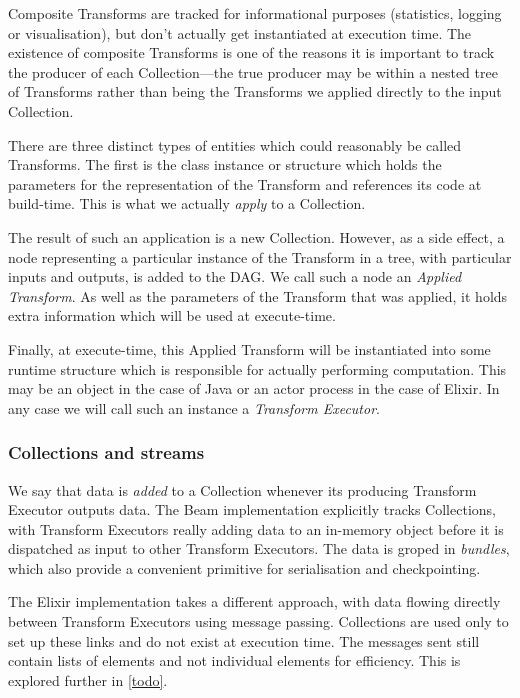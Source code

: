Composite Transforms are tracked for informational purposes (statistics, logging or visualisation), but don't actually get instantiated at execution time.
The existence of composite Transforms is one of the reasons it is important to track the producer of each Collection---the true producer may be within a nested tree of Transforms rather than being the Transforms we applied directly to the input Collection.



There are three distinct types of entities which could reasonably be called Transforms.
The first is the class instance or structure which holds the parameters for the representation of the Transform and references its code at build-time.
This is what we actually \emph{apply} to a Collection.

The result of such an application is a new Collection.
However, as a side effect, a node representing a particular instance of the Transform in a tree, with particular inputs and outputs, is added to the DAG.
We call such a node an \emph{Applied Transform}.
As well as the parameters of the Transform that was applied, it holds extra information which will be used at execute-time.

Finally, at execute-time, this Applied Transform will be instantiated into some runtime structure which is responsible for actually performing computation.
This may be an object in the case of Java or an actor process in the case of Elixir.
In any case we will call such an instance a \emph{Transform Executor}.

\subsubsection{Collections and streams}

We say that data is \emph{added} to a Collection whenever its producing Transform Executor outputs data.
The Beam implementation explicitly tracks Collections, with Transform Executors really adding data to an in-memory object before it is dispatched as input to other Transform Executors.
The data is groped in \emph{bundles}, which also provide a convenient primitive for serialisation and checkpointing.

The Elixir implementation takes a different approach, with data flowing directly between Transform Executors using message passing.
Collections are used only to set up these links and do not exist at execution time.
The messages sent still contain lists of elements and not individual elements for efficiency.
This is explored further in \cref{todo}.

